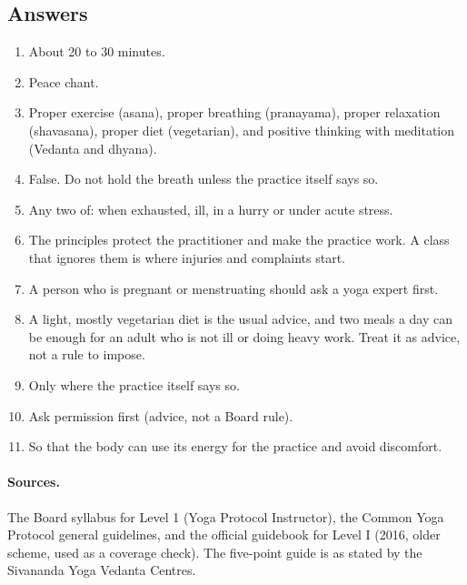 \subsection*{Answers}
\begin{enumerate}
\item About 20 to 30 minutes.
\item Peace chant.
\item Proper exercise (asana), proper breathing (pranayama), proper relaxation (shavasana), proper diet (vegetarian), and positive thinking with meditation (Vedanta and dhyana).
\item False. Do not hold the breath unless the practice itself says so.
\item Any two of: when exhausted, ill, in a hurry or under acute stress.
\item The principles protect the practitioner and make the practice work. A class that ignores them is where injuries and complaints start.
\item A person who is pregnant or menstruating should ask a yoga expert first.
\item A light, mostly vegetarian diet is the usual advice, and two meals a day can be enough for an adult who is not ill or doing heavy work. Treat it as advice, not a rule to impose.
\item Only where the practice itself says so.
\item Ask permission first (advice, not a Board rule).
\item So that the body can use its energy for the practice and avoid discomfort.
\end{enumerate}

\paragraph{Sources.} The Board syllabus for Level 1 (Yoga Protocol Instructor), the Common Yoga Protocol general guidelines, and the official guidebook for Level I (2016, older scheme, used as a coverage check). The five-point guide is as stated by the Sivananda Yoga Vedanta Centres.
